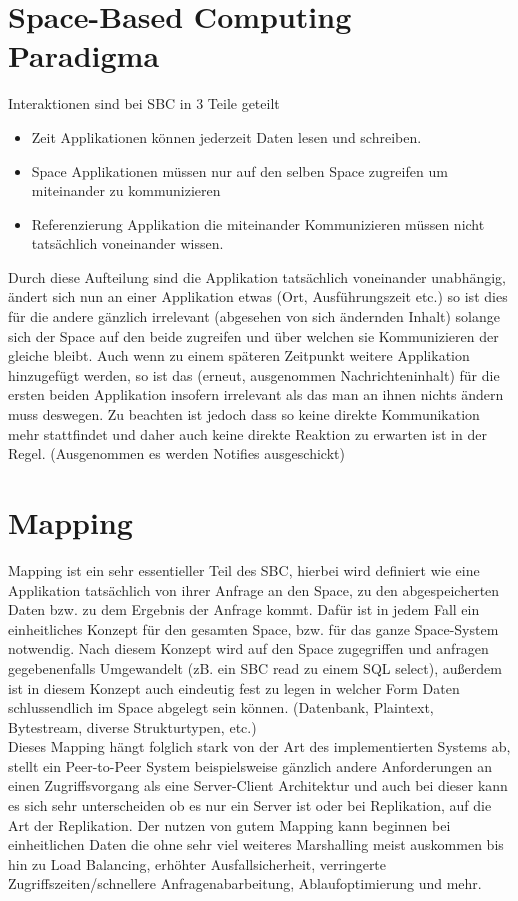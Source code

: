 \documentclass[a4paper,12pt]{scrreprt}
\begin{document}
	\section{Space-Based Computing Paradigma}
		Interaktionen sind bei SBC in 3 Teile geteilt 
		\begin{itemize}
			\item Zeit
				\subitem Applikationen können jederzeit Daten lesen und schreiben.
			\item Space
				\subitem Applikationen müssen nur auf den selben Space zugreifen um miteinander zu kommunizieren
			\item Referenzierung
				\subitem Applikation die miteinander Kommunizieren müssen nicht tatsächlich voneinander wissen.
		\end{itemize}
		Durch diese Aufteilung sind die Applikation tatsächlich voneinander unabhängig, ändert sich nun an einer Applikation etwas (Ort, Ausführungszeit etc.) so ist dies für die andere gänzlich irrelevant (abgesehen von sich ändernden Inhalt) solange sich der Space auf den beide zugreifen und über welchen sie Kommunizieren der gleiche bleibt. Auch wenn zu einem späteren Zeitpunkt weitere Applikation hinzugefügt werden, so ist das (erneut, ausgenommen Nachrichteninhalt) für die ersten beiden Applikation insofern irrelevant als das man an ihnen nichts ändern muss deswegen. Zu beachten ist jedoch dass so keine direkte Kommunikation mehr stattfindet und daher auch keine direkte Reaktion zu erwarten ist in der Regel. (Ausgenommen es werden Notifies ausgeschickt)
		
		
		
	\section{Mapping}
		Mapping ist ein sehr essentieller Teil des SBC, hierbei wird definiert wie eine Applikation tatsächlich von ihrer Anfrage an den Space, zu den abgespeicherten Daten bzw. zu dem Ergebnis der Anfrage kommt. Dafür ist in jedem Fall ein einheitliches Konzept für den gesamten Space, bzw. für das ganze Space-System notwendig. Nach diesem Konzept wird auf den Space zugegriffen und anfragen gegebenenfalls Umgewandelt (zB. ein SBC read zu einem SQL select), außerdem ist in diesem Konzept auch eindeutig fest zu legen in welcher Form Daten schlussendlich im Space abgelegt sein können. (Datenbank, Plaintext, Bytestream, diverse Strukturtypen, etc.) \\
		Dieses Mapping hängt folglich stark von der Art des implementierten Systems ab, stellt ein Peer-to-Peer System beispielsweise gänzlich andere Anforderungen an einen Zugriffsvorgang als eine Server-Client Architektur und auch bei dieser kann es sich sehr unterscheiden ob es nur ein Server ist oder bei Replikation, auf die Art der Replikation. Der nutzen von gutem Mapping kann beginnen bei einheitlichen Daten die ohne sehr viel weiteres Marshalling meist auskommen bis hin zu Load Balancing, erhöhter Ausfallsicherheit, verringerte Zugriffszeiten/schnellere Anfragenabarbeitung, Ablaufoptimierung und mehr.
	
\end{document}
